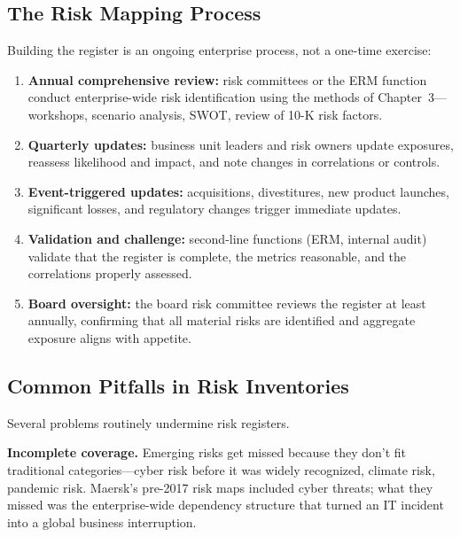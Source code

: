 \documentclass[11pt,openany]{book}
\providecommand{\tightlist}{\setlength{\itemsep}{0pt}\setlength{\parskip}{0pt}}
\begin{document}
\subsection{The Risk Mapping Process}
\label{subsec:mapping-process}

Building the register is an ongoing enterprise process, not a one-time
exercise:

\begin{enumerate}\tightlist
  \item \textbf{Annual comprehensive review:} risk committees or the ERM
        function conduct enterprise-wide risk identification using the methods
        of Chapter~3---workshops, scenario analysis, SWOT, review of 10-K risk
        factors.
  \item \textbf{Quarterly updates:} business unit leaders and risk owners
        update exposures, reassess likelihood and impact, and note changes in
        correlations or controls.
  \item \textbf{Event-triggered updates:} acquisitions, divestitures, new
        product launches, significant losses, and regulatory changes trigger
        immediate updates.
  \item \textbf{Validation and challenge:} second-line functions (ERM,
        internal audit) validate that the register is complete, the metrics
        reasonable, and the correlations properly assessed.
  \item \textbf{Board oversight:} the board risk committee reviews the
        register at least annually, confirming that all material risks are
        identified and aggregate exposure aligns with appetite.
\end{enumerate}

\subsection{Common Pitfalls in Risk Inventories}
\label{subsec:register-pitfalls}

Several problems routinely undermine risk registers.

\textbf{Incomplete coverage.} Emerging risks get missed because they don't fit
traditional categories---cyber risk before it was widely recognized, climate
risk, pandemic risk. Maersk's pre-2017 risk maps included cyber threats; what
they missed was the enterprise-wide dependency structure that turned an IT
incident into a global business interruption.
\end{document}
